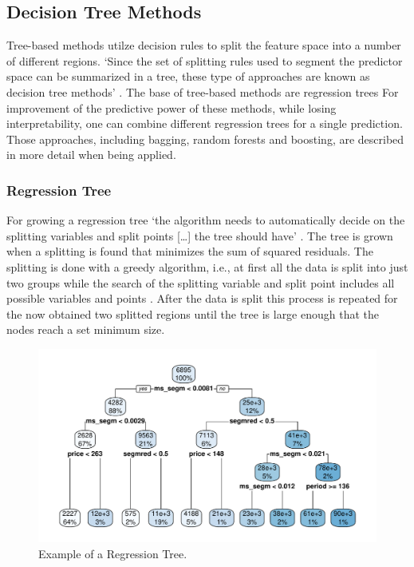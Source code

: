 \documentclass[11pt,]{article}
\begin{document}
\hypertarget{decision-tree-methods}{%
\subsection{Decision Tree Methods}\label{decision-tree-methods}}

Tree-based methods utilze decision rules to split the feature space into
a number of different regions. `Since the set of splitting rules used to
segment the predictor space can be summarized in a tree, these type of
approaches are known as decision tree methods'
\autocite[][p. 303]{Hastie2013}. The base of tree-based methods are
regression trees For improvement of the predictive power of these
methods, while losing interpretability, one can combine different
regression trees for a single prediction. Those approaches, including
bagging, random forests and boosting, are described in more detail when
being applied.

\hypertarget{regression-tree}{%
\subsubsection{Regression Tree}\label{regression-tree}}

For growing a regression tree `the algorithm needs to automatically
decide on the splitting variables and split points {[}\ldots{}{]} the
tree should have' \autocite[][p. 349]{Hastie2013}. The tree is grown
when a splitting is found that minimizes the sum of squared residuals.
The splitting is done with a greedy algorithm, i.e., at first all the
data is split into just two groups while the search of the splitting
variable and split point includes all possible variables and points
\autocite[cf.][p. 349]{Hastie2013}. After the data is split this process
is repeated for the now obtained two splitted regions until the tree is
large enough that the nodes reach a set minimum size.

\begin{figure}
\centering
\includegraphics{../00_data/output_paper/09_tree.pdf}
\caption{\label{fig:tree}Example of a Regression Tree.}
\end{figure}
\end{document}
